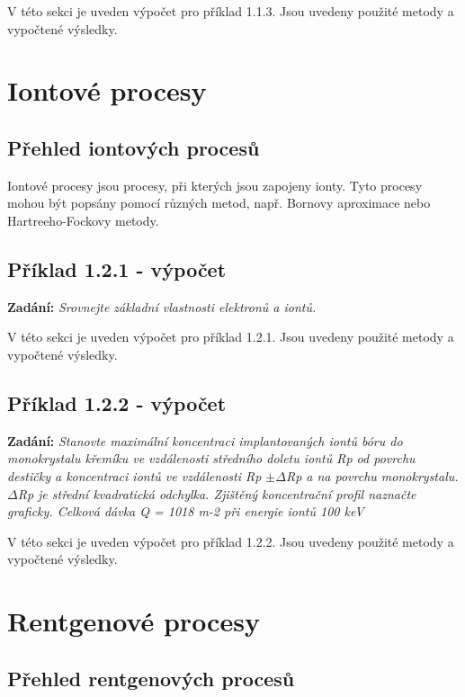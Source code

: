 \documentclass{article}
\newenvironment{zadani}
{\begin{center}\textbf{Zadání:}\itshape}{\end{center}}
\begin{document}
V této sekci je uveden výpočet pro příklad 1.1.3. Jsou uvedeny použité metody a vypočtené výsledky.

\section{Iontové procesy}

\subsection{Přehled iontových procesů}

Iontové procesy jsou procesy, při kterých jsou zapojeny ionty. Tyto procesy mohou být popsány pomocí různých metod, např. Bornovy aproximace nebo Hartreeho-Fockovy metody.

\subsection{Příklad 1.2.1 - výpočet}
\begin{zadani}
    Srovnejte základní vlastnosti elektronů a iontů.
\end{zadani}


V této sekci je uveden výpočet pro příklad 1.2.1. Jsou uvedeny použité metody a vypočtené výsledky.

\subsection{Příklad 1.2.2 - výpočet}
\begin{zadani}
    Stanovte maximální koncentraci implantovaných iontů bóru do 
    monokrystalu křemíku ve vzdálenosti středního doletu iontů  Rp od 
    povrchu destičky a koncentraci iontů ve vzdálenosti  Rp \(\pm \Delta\)Rp a na 
    povrchu monokrystalu.  \(\Delta\)Rp  je střední kvadratická odchylka. Zjištěný  
    koncentrační profil naznačte graficky. Celková dávka  Q = 1018 m-2 při  
    energie iontů  100 keV
\end{zadani}


V této sekci je uveden výpočet pro příklad 1.2.2. Jsou uvedeny použité metody a vypočtené výsledky.

\section{Rentgenové procesy}

\subsection{Přehled rentgenových procesů}
\end{document}
